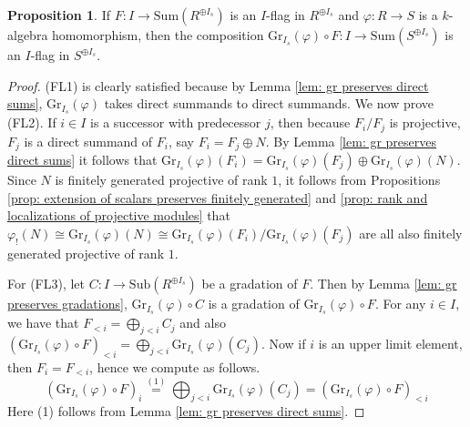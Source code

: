 \documentclass[oneside,11pt]{amsart}
\newcommand{\Sum}{\ensuremath{\text{Sum}}}
\newcommand{\Sub}{\ensuremath{\text{Sub}}}
\newcommand{\Gr}{\ensuremath{\text{Gr}}}
\theoremstyle{definition}
\newtheorem{proof techniques}{Proof Techniques}
\newtheorem{proposition}{Proposition}
\begin{document}


\begin{proposition}
If $F : I \to \Sum(R^{\oplus I_s})$ is an $I$-flag in $R^{\oplus I_s}$ and $\varphi : R \to S$ is a $k$-algebra homomorphism, then the composition $\Gr_{I_s}(\varphi) \circ F : I \to \Sum(S^{\oplus I_s})$ is an $I$-flag in $S^{\oplus I_s}$. 
\end{proposition}

\begin{proof}
(FL1) is clearly satisfied because by Lemma \ref{lem: gr preserves direct sums}, $\Gr_{I_s}(\varphi)$ takes direct summands to direct summands. We now prove (FL2). If $i \in I$ is a successor with predecessor $j$, then because $F_i / F_j$ is projective, $F_j$ is a direct summand of $F_i$, say $F_i = F_j \oplus N$. By Lemma \ref{lem: gr preserves direct sums} it follows that $\Gr_{I_s}(\varphi)(F_i) = \Gr_{I_s}(\varphi)(F_j) \oplus \Gr_{I_s}(\varphi)(N)$. Since $N$ is finitely generated projective of rank $1$, it follows from Propositions \ref{prop: extension of scalars preserves finitely generated} and \ref{prop: rank and localizations of projective modules} that $\varphi_! (N) \cong \Gr_{I_s}(\varphi)(N) \cong \Gr_{I_s}(\varphi)(F_i) / \Gr_{I_s}(\varphi)(F_j)$ are all also finitely generated projective of rank $1$. 

For (FL3), let $C : I \to \Sub(R^{\oplus I_s})$ be a gradation of $F$. Then by Lemma \ref{lem: gr preserves gradations}, $\Gr_{I_s}(\varphi) \circ C$ is a gradation of $\Gr_{I_s}(\varphi) \circ F$. For any $i \in I$, we have that $F_{<i} = \bigoplus_{j < i} C_j$ and also $(\Gr_{I_s}(\varphi) \circ F)_{<i} = \bigoplus_{j < i} \Gr_{I_s}(\varphi)(C_j)$. Now if $i$ is an upper limit element, then $F_i = F_{<i}$, hence we compute as follows. 
\begin{equation*}
(\Gr_{I_s}(\varphi) \circ F)_i \overset{(1)}{=} \bigoplus_{j < i} \Gr_{I_s}(\varphi)(C_j) = (\Gr_{I_s}(\varphi) \circ F)_{<i}
\end{equation*}
Here (1) follows from Lemma \ref{lem: gr preserves direct sums}. 

\end{proof}

\end{document}
